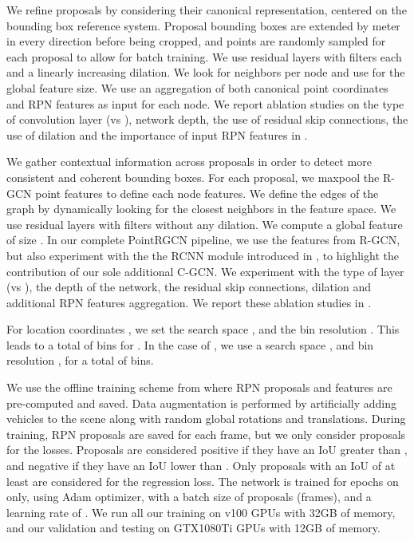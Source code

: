 \documentclass[10pt,twocolumn,letterpaper]{article}
\begin{document}
We refine proposals by considering their canonical representation, centered on the bounding box reference system.
Proposal bounding boxes are extended by  meter in every direction before being cropped, and  points are randomly sampled for each proposal to allow for batch training.
We use  residual \MRGCN layers with  filters each and a linearly increasing dilation.
We look for  neighbors per node and use  for the global feature size.
We use an aggregation of both canonical point coordinates and RPN features as input for each node.
We report ablation studies on the type of convolution layer (\ie \EdgeConv vs \MRGCN), network depth, the use of residual skip connections, the use of dilation and the importance of input RPN features in .


We gather contextual information across proposals in order to detect more consistent and coherent bounding boxes.
For each proposal, we maxpool the R-GCN point features to define each node features.
We define the edges of the graph by dynamically looking for the closest  neighbors in the feature space.
We use  residual \EdgeConv layers with  filters without any dilation.
We compute a global feature of size .
In our complete PointRGCN pipeline, we use the features from R-GCN, but also experiment with the the RCNN module introduced in \PointRCNN, to highlight the contribution of our sole additional C-GCN.
We experiment with the type of layer (\EdgeConv vs \MRGCN), the depth of the network, the residual skip connections, dilation and additional RPN features aggregation. 
We report these ablation studies in .


For location coordinates , we set the search space , and the bin resolution .
This leads to a total of  bins for .
In the case of , we use a search space , and bin resolution , for a total of  bins.


We use the offline training scheme from \cite{shi2019pointrcnn} where RPN proposals and features are pre-computed and saved.
Data augmentation is performed by artificially adding vehicles to the scene along with random global rotations and translations.
During training,  RPN proposals are saved for each frame, but we only consider  proposals for the losses.
Proposals are considered positive if they have an IoU greater than , and negative if they have an IoU lower than .
Only proposals with an IoU of at least  are considered for the regression loss.
The network is trained for  epochs on \KITTItrain only, using Adam optimizer, with a batch size of  proposals (\ie  frames), and a learning rate of .
We run all our training on v100 GPUs with 32GB of memory, and our validation and testing on GTX1080Ti GPUs with 12GB of memory.
\end{document}
